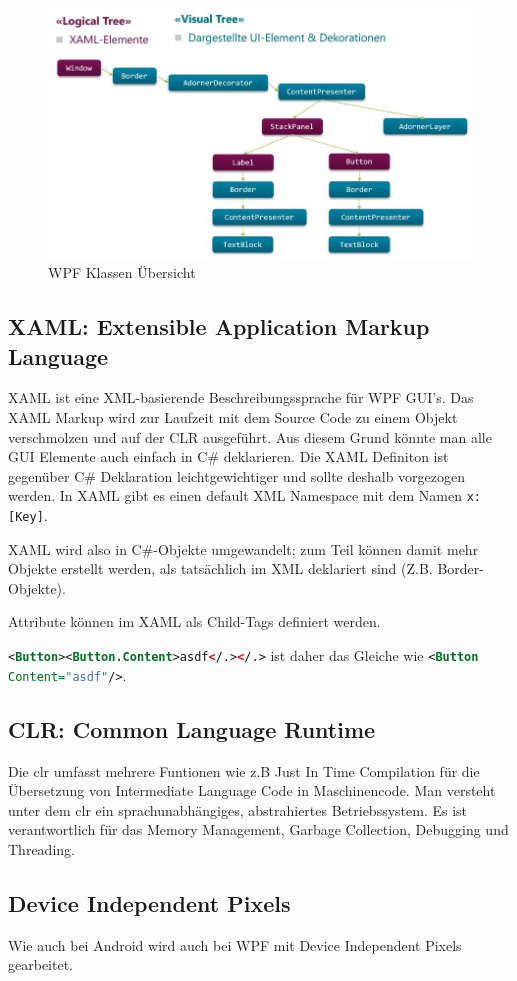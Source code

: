 \begin{figure}[h]
\centering
\includegraphics[width=0.7\linewidth]{images/wpf_overview}
\caption{WPF Klassen Übersicht}
\label{fig:wpfoverview}
\end{figure}

\subsection{XAML: Extensible Application Markup Language}
XAML ist eine XML-basierende Beschreibungssprache für WPF GUI's. Das XAML Markup wird zur Laufzeit mit dem Source Code zu einem Objekt verschmolzen und auf der CLR ausgeführt. Aus diesem Grund könnte man alle GUI Elemente auch einfach in C\# deklarieren. Die XAML Definiton ist gegenüber C\# Deklaration leichtgewichtiger und sollte deshalb vorgezogen werden. In XAML gibt es einen default XML Namespace mit dem Namen \lstinline|x:[Key]|.

XAML wird also in C\#-Objekte umgewandelt; zum Teil können damit mehr Objekte erstellt werden, als tatsächlich im XML deklariert sind (Z.B. Border-Objekte).

Attribute können im XAML als Child-Tags definiert werden.

\lstinline[language=xml]|<Button><Button.Content>asdf</.></.>| ist daher das Gleiche wie \lstinline[language=xml]|<Button Content="asdf"/>|.

\subsection{CLR: Common Language Runtime}
Die \gls{clr} umfasst mehrere Funtionen wie z.B Just In Time Compilation für die Übersetzung von Intermediate Language Code in Maschinencode. Man versteht unter dem \gls{clr} ein sprachunabhängiges, abstrahiertes Betriebssystem. Es ist verantwortlich für das Memory Management, Garbage Collection, Debugging und Threading.

\subsection{Device Independent Pixels}
Wie auch bei Android wird auch bei WPF mit Device Independent Pixels gearbeitet. 

